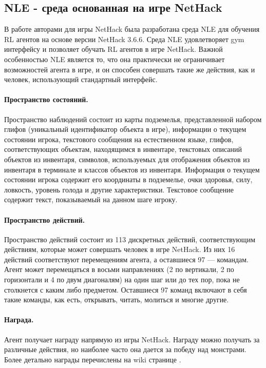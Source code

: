 \subsection{NLE - среда основанная на игре NetHack}
В работе \cite{nethack} авторами для игры NetHack была разработана среда NLE для обучения RL агентов на основе версии NetHack 3.6.6. Среда NLE удовлетворяет gym интерфейсу \cite{brockman2016openai} и позволяет обучать RL агентов в игре NetHack. Важной особенностью NLE является то, что она практически не ограничивает возможностей агента в игре, и он способен совершать такие же действия, как и человек, использующий стандартный интерфейс. 

\paragraph{Пространство состояний.}
Пространство наблюдений состоит из карты подземелья, представленной набором глифов (уникальный идентификатор объекта в игре), информации о текущем состоянии игрока, текстового сообщения на естественном языке, глифов, соответствующих объектам, находящимся в инвентаре, текстовых описаний объектов из инвентаря, символов, используемых для отображения объектов из инвентаря в терминале и классов объектов из инвентаря. Информация о текущем состоянии игрока содержит его координаты в подземелье,  очки здоровья, силу, ловкость, уровень голода и другие характеристики. Текстовое сообщение содержит текст, показываемый на данном шаге игроку. 

\paragraph{Пространство действий.} Пространство действий состоит из 113 дискретных действий, соответствующим действиям, которые может совершать человек в игре NetHack. Из них 16 действий соответствуют перемещениям агента, а оставшиеся 97 --- командам. Агент может перемещаться в восьми направлениях (2 по вертикали, 2 по горизонтали и 4 по двум диагоналям) на один шаг или до тех пор, пока  не столкнется с каким либо предметом. Оставшиеся 97 команд включают в себя такие команды, как есть, открывать, читать, молиться и многие другие.

\paragraph{Награда.}
Агент получает награду напрямую из игры NetHack. Награду можно получать за различные действия, но наиболее часто она дается за победу над монстрами. Более детально награды перечислены на wiki странице \cite{nethack_wiki}. 

